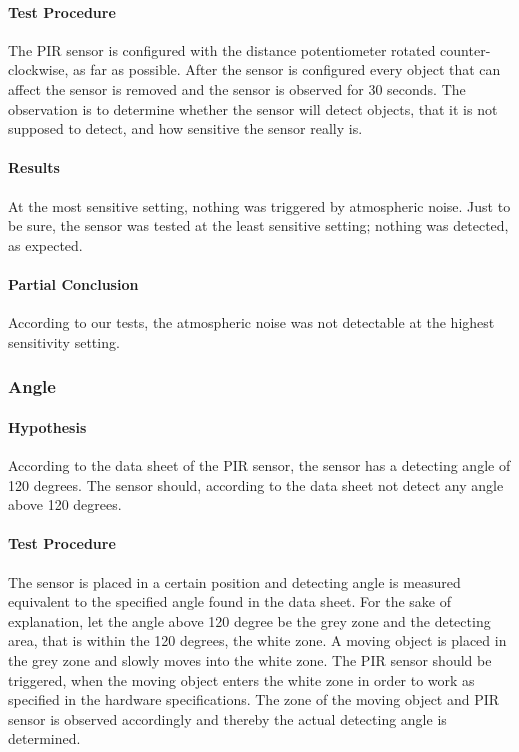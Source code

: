 \paragraph{Test Procedure}
\label{subp:SenTest Procedure}
The PIR sensor is configured with the distance potentiometer rotated
counter-clockwise, as far as possible.
After the sensor is configured every object that can affect the sensor is
removed and the sensor is observed for 30 seconds.
The observation is to determine whether the sensor will detect objects, that it is not
supposed to detect, and how sensitive the sensor really is.
\paragraph{Results}
\label{subp:SenResults}

At the most sensitive setting, nothing was triggered by atmospheric noise. Just
to be sure, the sensor was tested at the least sensitive setting; nothing was
detected, as expected.

\paragraph{Partial Conclusion}
\label{subp:SenPartial Conclusion}

According to our tests, the atmospheric noise was not detectable at the highest
sensitivity setting.

\subsubsection{Angle}
\label{par:Angle}

\paragraph{Hypothesis}
\label{subp:AngHypothesis}
According to the data sheet of the PIR sensor,
the sensor has a detecting angle of 120 degrees.
The sensor should, according to the data sheet not detect any angle above 120 degrees.

\paragraph{Test Procedure}
\label{subp:AngTest Procedure}
The sensor is placed in a certain position and detecting angle is measured equivalent to
the specified angle found in the data sheet.
For the sake of explanation, let the angle above 120 degree be the grey zone and
the detecting area, that is within the 120 degrees, the white zone.
A moving object is placed in the grey zone and slowly moves into the white zone.
The PIR sensor should be triggered, when the moving object enters the white zone in order
to work as specified in the hardware specifications.
The zone of the moving object and PIR sensor is observed accordingly
and thereby the actual detecting angle is determined.

